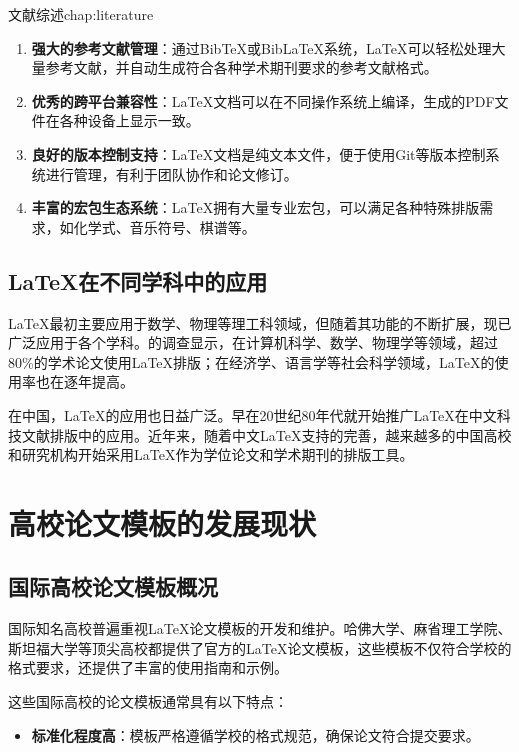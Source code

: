 \begin{cuzchapter}{文献综述}{chap:literature}
\begin{enumerate}
		\item \textbf{强大的参考文献管理}：通过BibTeX或BibLaTeX系统，\LaTeX{}可以轻松处理大量参考文献，并自动生成符合各种学术期刊要求的参考文献格式。
		
		\item \textbf{优秀的跨平台兼容性}：\LaTeX{}文档可以在不同操作系统上编译，生成的PDF文件在各种设备上显示一致。
		
		\item \textbf{良好的版本控制支持}：\LaTeX{}文档是纯文本文件，便于使用Git等版本控制系统进行管理，有利于团队协作和论文修订。
		
		\item \textbf{丰富的宏包生态系统}：\LaTeX{}拥有大量专业宏包，可以满足各种特殊排版需求，如化学式、音乐符号、棋谱等。
	\end{enumerate}
	
	\subsection{LaTeX在不同学科中的应用}
	
	\LaTeX{}最初主要应用于数学、物理等理工科领域，但随着其功能的不断扩展，现已广泛应用于各个学科。\citet{hls2012jinji}的调查显示，在计算机科学、数学、物理学等领域，超过80\%的学术论文使用\LaTeX{}排版；在经济学、语言学等社会科学领域，\LaTeX{}的使用率也在逐年提高。
	
	在中国，\LaTeX{}的应用也日益广泛。\citet{chen1980zhongguo}早在20世纪80年代就开始推广\LaTeX{}在中文科技文献排版中的应用。近年来，随着中文\LaTeX{}支持的完善，越来越多的中国高校和研究机构开始采用\LaTeX{}作为学位论文和学术期刊的排版工具。
	
	\section{高校论文模板的发展现状}\label{sec:template-status}
	
	\subsection{国际高校论文模板概况}
	
	国际知名高校普遍重视\LaTeX{}论文模板的开发和维护。哈佛大学、麻省理工学院、斯坦福大学等顶尖高校都提供了官方的\LaTeX{}论文模板，这些模板不仅符合学校的格式要求，还提供了丰富的使用指南和示例。
	
	这些国际高校的论文模板通常具有以下特点：
	
	\begin{itemize}
		\item \textbf{标准化程度高}：模板严格遵循学校的格式规范，确保论文符合提交要求。
		

\end{itemize}
\end{cuzchapter}

